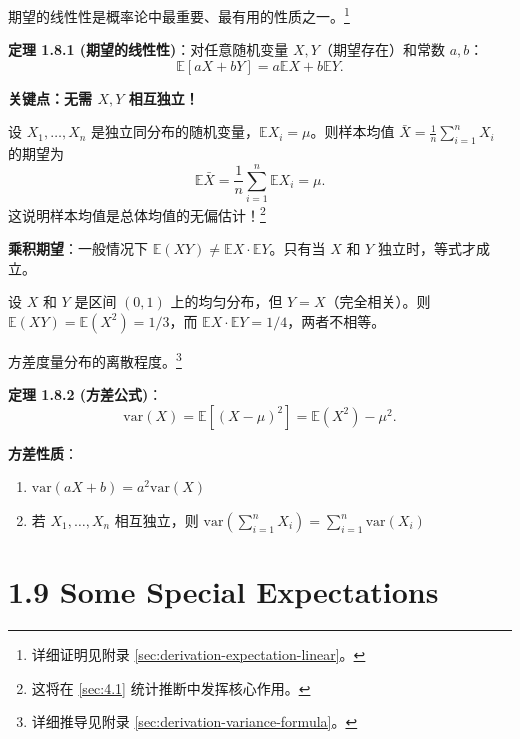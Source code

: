 期望的线性性是概率论中最重要、最有用的性质之一。\footnote{详细证明见附录 \cref{sec:derivation-expectation-linear}。}

\begin{remark}
\textbf{定理 1.8.1 (期望的线性性)}：对任意随机变量 $X, Y$（期望存在）和常数 $a, b$：
\[
\mathbb{E}[aX + bY] = a\mathbb{E}X + b\mathbb{E}Y.
\tag{1.8.1}\label{eq:expectation-linearity-ch1}
\]

\textbf{关键点：无需 $X, Y$ 相互独立！}
\end{remark}

\begin{example}[样本均值]\label{ex:sample-mean-ch1}
设 $X_1, \ldots, X_n$ 是独立同分布的随机变量，$\mathbb{E}X_i = \mu$。则样本均值 $\bar{X} = \frac{1}{n}\sum_{i=1}^n X_i$ 的期望为
\[
\mathbb{E}\bar{X} = \frac{1}{n}\sum_{i=1}^n \mathbb{E}X_i = \mu.
\]
这说明样本均值是总体均值的无偏估计！\footnote{这将在 \cref{sec:4.1} 统计推断中发挥核心作用。}
\end{example}

\textbf{乘积期望}：一般情况下 $\mathbb{E}(XY) \neq \mathbb{E}X \cdot \mathbb{E}Y$。只有当 $X$ 和 $Y$ 独立时，等式才成立。

\begin{example}[乘积期望]\label{ex:product-expectation-ch1}
设 $X$ 和 $Y$ 是区间 $(0, 1)$ 上的均匀分布，但 $Y = X$（完全相关）。则 $\mathbb{E}(XY) = \mathbb{E}(X^2) = 1/3$，而 $\mathbb{E}X \cdot \mathbb{E}Y = 1/4$，两者不相等。
\end{example}

方差度量分布的离散程度。\footnote{详细推导见附录 \cref{sec:derivation-variance-formula}。}

\begin{remark}
\textbf{定理 1.8.2 (方差公式)}：
\[
\text{var}(X) = \mathbb{E}[(X - \mu)^2] = \mathbb{E}(X^2) - \mu^2.
\tag{1.8.2}\label{eq:variance-formula-ch1}
\]

\textbf{方差性质}：
\begin{enumerate}
    \item $\text{var}(aX + b) = a^2 \text{var}(X)$
    \item 若 $X_1, \ldots, X_n$ 相互独立，则 $\text{var}\left(\sum_{i=1}^{n} X_i\right) = \sum_{i=1}^{n} \text{var}(X_i)$
\end{enumerate}
\end{remark}

\section{1.9 Some Special Expectations}\label{sec:1.9}

